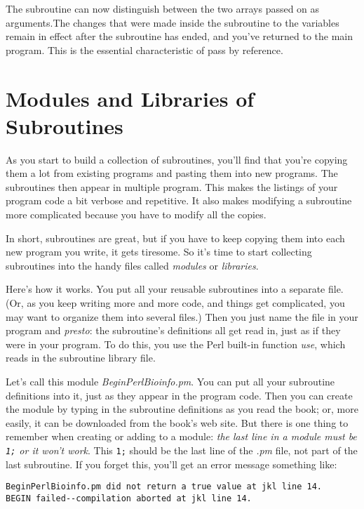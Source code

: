 The subroutine can now distinguish between the two arrays passed on as arguments.The changes that were made inside the subroutine to the variables remain in effect after the subroutine has ended, and you've returned to the main program. This is the essential characteristic of pass by reference. 

\section{Modules and Libraries of Subroutines}
As you start to build a collection of subroutines, you'll find that you're copying them a lot from existing programs and pasting them into new programs. The subroutines then appear in multiple program. This makes the listings of your program code a bit verbose and repetitive. It also makes modifying a subroutine more complicated because you have to modify all the copies.

In short, subroutines are great, but if you have to keep copying them into each new program you write, it gets tiresome. So it's time to start collecting subroutines into the handy files called \textit{modules} or \textit{libraries}.

Here's how it works. You put all your reusable subroutines into a separate file. (Or, as you keep writing more and more code, and things get complicated, you may want to organize them into several files.) Then you just name the file in your program and \textit{presto}: the subroutine's definitions all get read in, just as if they were in your program. To do this, you use the Perl built-in function \textit{use}, which reads in the subroutine library file.

Let's call this module \textit{BeginPerlBioinfo.pm}. You can put all your subroutine definitions into it, just as they appear in the program code. Then you can create the module by typing in the subroutine definitions as you read the book; or, more easily, it can be downloaded from the book's web site. But there is one thing to remember when creating or adding to a module: \textit{the last line in a module must be \texttt{1;} or it won't work}. This \verb|1;| should be the last line of the \textit{.pm} file, not part of the last subroutine. If you forget this, you'll get an error message something like: 

\begin{lstlisting}
BeginPerlBioinfo.pm did not return a true value at jkl line 14.
BEGIN failed--compilation aborted at jkl line 14.
\end{lstlisting}

